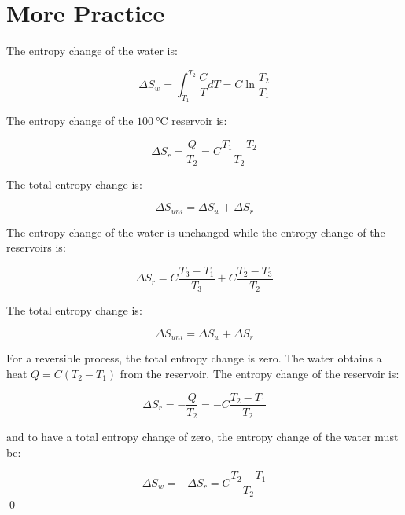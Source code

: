 \documentclass[12pt]{article}
\begin{document}



\pagebreak
\section*{More Practice}



The entropy change of the water is:

\begin{equation}
    \Delta S_{w} = \int_{T_{1}}^{T_{2}} \frac{C}{T} dT = C \ln{\frac{T_{2}}{T_{1}}}
\end{equation}

The entropy change of the $\qty{100}{\celsius}$ reservoir is:

\begin{equation}
    \Delta S_{r} = \frac{Q}{T_{2}} = C \frac{T_{1} - T_{2}}{T_{2}}
\end{equation}

The total entropy change is:

\begin{equation}
    \Delta S_{uni} = \Delta S_{w} + \Delta S_{r}
\end{equation}

The entropy change of the water is unchanged while the entropy change of the reservoirs is:

\begin{equation}
    \Delta S_{r} = C \frac{T_{3} - T_{1}}{T_{3}} + C \frac{T_{2} - T_{3}}{T_{2}}
\end{equation}

The total entropy change is:

\begin{equation}
    \Delta S_{uni} = \Delta S_{w} + \Delta S_{r}
\end{equation}

For a reversible process, the total entropy change is zero. The water obtains a heat $Q = C (T_{2} - T_{1})$ from the reservoir. The entropy change of the reservoir is:

\begin{equation}
    \Delta S_{r} = - \frac{Q}{T_{2}} = - C \frac{T_{2} - T_{1}}{T_{2}}
\end{equation}

and to have a total entropy change of zero, the entropy change of the water must be:

\begin{equation}
    \Delta S_{w} = - \Delta S_{r} = C \frac{T_{2} - T_{1}}{T_{2}}
\end{equation}
\qed
\end{document}
